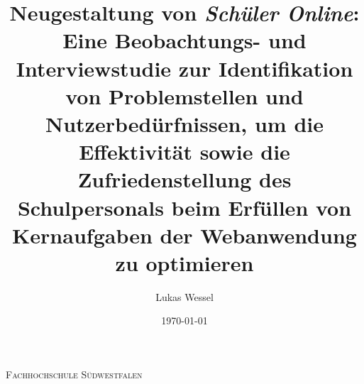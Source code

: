 \documentclass[pdftex,a4paper,abstracton,11pt,parskip=half,bibtotocnumbered]{scrartcl}
\title{Neugestaltung von \textit{Schüler Online}: Eine Beobachtungs- und Interviewstudie zur Identifikation von Problemstellen und Nutzerbedürfnissen, um die Effektivität sowie die Zufriedenstellung des Schulpersonals beim Erfüllen von Kernaufgaben der Webanwendung zu optimieren}
\author{Lukas Wessel}
\date{\today}
\begin{document}

\makeatletter
\begin{titlepage}
	\centering
	{\scshape\LARGE Fachhochschule Südwestfalen \par}
	\vspace{1cm}
	\vspace{1.5cm}
	{\huge\bfseries \@title\par}
	\vspace{3cm}
	{\Large \@author\par}
	\vspace{1cm}
	{\Large \@date\par}
	\vfill

	\raggedright
\end{titlepage}
\makeatother

\thispagestyle{empty}















\end{document}
